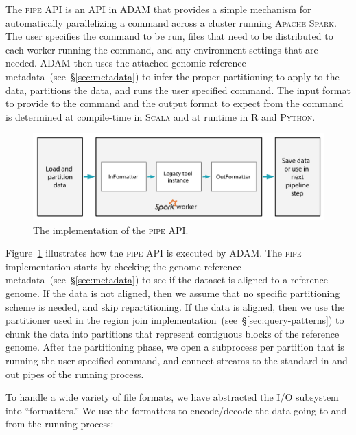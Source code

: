 \documentclass[phd]{ucbthesis}
\begin{document}
The \textsc{pipe} API is an API in \textsc{ADAM} that provides a simple
mechanism for automatically parallelizing a command across a cluster running
\textsc{Apache Spark}. The user specifies the command to be run, files that need
to be distributed to each worker running the command, and any environment
settings that are needed. \textsc{ADAM} then uses the attached genomic reference
metadata~(see~\S\ref{sec:metadata}) to infer the proper partitioning to apply to
the data, partitions the data, and runs the user specified command. The input
format to provide to the command and the output format to expect from the
command is determined at compile-time in \textsc{Scala} and at runtime in R and
\textsc{Python}.

\begin{figure}[h]
\begin{center}
\includegraphics[width=0.95\linewidth]{graphs/pipe.pdf}
\end{center}
\caption{The implementation of the \textsc{pipe} API.}
\label{fig:pipe}
\end{figure}

Figure~\ref{fig:pipe} illustrates how the \textsc{pipe} API is executed by
\textsc{ADAM}. The \textsc{pipe} implementation starts by checking the genome
reference metadata~(see~\S\ref{sec:metadata}) to see if the dataset is aligned
to a reference genome. If the data is not aligned, then we assume that no
specific partitioning scheme is needed, and skip repartitioning. If the data is
aligned, then we use the partitioner used in the region join
implementation~(see~\S\ref{sec:query-patterns}) to chunk the data into
partitions that represent contiguous blocks of the reference genome. After the
partitioning phase, we open a subprocess per partition that is running the user
specified command, and connect streams to the standard in and out pipes of the
running process.

To handle a wide variety of file formats, we have abstracted the I/O subsystem
into ``formatters.'' We use the formatters to encode/decode the data going to
and from the running process:
\end{document}
